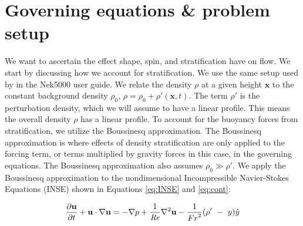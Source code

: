 \section{Governing equations {\&} problem setup}
\label{section:governing_equations_and_setup}
We want to ascertain the effect shape, spin, and stratification have on flow. We start by discussing how we account for stratification. We use the same setup used by \cite{fischer_nek5000_nodate} in the Nek5000 user guide. We relate the density $\rho$ at a given height $\mathbf{x}$ to the constant background density $\rho_0$, $\rho = \rho_0 + \rho ' (\mathbf{x},t)$. The term $\rho'$ is the perturbation density, which we will assume to have a linear profile. This means the overall density $\rho$ has a linear profile. To account for the buoyancy forces from stratification, we utilize the Boussinesq approximation. The Boussinesq approximation is where effects of density stratification are only applied to the forcing term, or terms multiplied by gravity forces in this case, in the governing equations. The Boussinesq approximation also assumes $\rho_0 \gg \rho '$.
We apply the Boussinesq approximation to the nondimensional Incompressible Navier-Stokes Equations (INSE) shown in Equations \ref{eq:INSE} and \ref{eq:cont}:

\begin{equation}
    \label{eq:INSE}
    \frac{\partial\mathbf{u}}{\partial t}+\mathbf{u}\cdot\nabla\mathbf{u}=-\nabla p+\frac{1}{\mathit{Re}}\nabla^2\mathbf{u}-\frac{1}{{Fr}^2} (\rho^\prime\ -\ y )\hat{y}
\end{equation}


